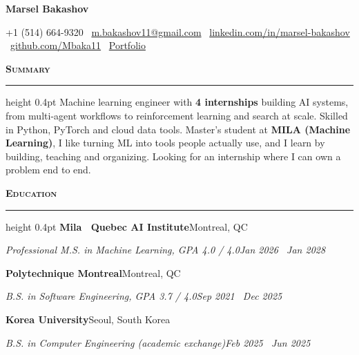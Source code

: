 \documentclass[letterpaper,11pt]{article}
\newcommand{\sep}{\textbar\ }
\newlength{\cvindent}\setlength{\cvindent}{7pt}
\newcommand{\cvsection}[1]{\vspace{9pt}\noindent\textbf{\textsc{#1}}\par\nointerlineskip\vspace{3pt}\hrule height 0.4pt\vspace{7pt}}
\newcommand{\cvrowin}[2]{\noindent\hspace{\cvindent}#1\hfill #2\hspace{\cvindent}\par}
\begin{document}
\fontsize{10.5}{12.6}\selectfont

\begin{center}
  {\fontsize{26}{28}\selectfont\textbf{Marsel Bakashov}}\par\vspace{2pt}
  {\small +1 (514) 664-9320 \sep \href{mailto:m.bakashov11@gmail.com}{m.bakashov11@gmail.com} \sep \href{https://www.linkedin.com/in/marsel-bakashov-813643213/}{linkedin.com/in/marsel-bakashov} \sep \href{https://github.com/Mbaka11}{github.com/Mbaka11} \sep \href{https://marselbak.netlify.app/}{Portfolio}}
\end{center}
\vspace{-8pt}

\cvsection{Summary}
Machine learning engineer with \textbf{4 internships} building AI systems, from multi-agent workflows to reinforcement learning and search at scale. Skilled in Python, PyTorch and cloud data tools. Master's student at \textbf{MILA (Machine Learning)}, I like turning ML into tools people actually use, and I learn by building, teaching and organizing. Looking for an internship where I can own a problem end to end.

\cvsection{Education}
\cvrowin{\textbf{Mila \textendash\ Quebec AI Institute}}{Montreal, QC}
\cvrowin{\textit{Professional M.S. in Machine Learning, GPA 4.0 / 4.0}}{\textit{Jan 2026 \textendash\ Jan 2028}}
\cvrowin{\textbf{Polytechnique Montreal}}{Montreal, QC}
\cvrowin{\textit{B.S. in Software Engineering, GPA 3.7 / 4.0}}{\textit{Sep 2021 \textendash\ Dec 2025}}
\cvrowin{\textbf{Korea University}}{Seoul, South Korea}
\cvrowin{\textit{B.S. in Computer Engineering (academic exchange)}}{\textit{Feb 2025 \textendash\ Jun 2025}}
\end{document}
